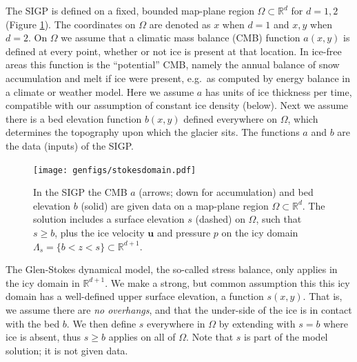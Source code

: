 \documentclass[letterpaper,final,12pt,reqno]{amsart}
\theoremstyle{claim}
\newcommand{\RR}{\mathbb{R}}
\newcommand{\bu}{\mathbf{u}}
\numberwithin{equation}{section}
\numberwithin{figure}{section}
\numberwithin{table}{section}
\numberwithin{theorem}{section}
\begin{document}
The SIGP is defined on a fixed, bounded map-plane region $\Omega \subset \RR^d$ for $d=1,2$ (Figure \ref{fig:stokesdomain}).  The coordinates on $\Omega$ are denoted as $x$ when $d=1$ and $x,y$ when $d=2$.  On $\Omega$ we assume that a climatic mass balance (CMB) \cite{Cogleyetal2011} function $a(x,y)$ is defined at every point, whether or not ice is present at that location.  In ice-free areas this function is the ``potential'' CMB, namely the annual balance of snow accumulation and melt if ice were present, e.g.~as computed by energy balance in a climate or weather model.  Here we assume $a$ has units of ice thickness per time, compatible with our assumption of constant ice density (below).  Next we assume there is a bed elevation function $b(x,y)$ defined everywhere on $\Omega$, which determines the topography upon which the glacier sits.  The functions $a$ and $b$ are the data (inputs) of the SIGP.

\begin{figure}[t]
\begin{center}
\texttt{[image: genfigs/stokesdomain.pdf]}
\end{center}
\caption{In the SIGP the CMB $a$ (arrows; down for accumulation) and bed elevation $b$ (solid) are given data on a map-plane region $\Omega \subset \RR^d$.  The solution includes a surface elevation $s$ (dashed) on $\Omega$, such that $s\ge b$, plus the ice velocity $\bu$ and pressure $p$ on the icy domain $\Lambda_s = \{b < z < s\} \subset \RR^{d+1}$.}
\label{fig:stokesdomain}
\end{figure}

The Glen-Stokes dynamical model, the so-called stress balance, only applies in the icy domain in $\RR^{d+1}$.  We make a strong, but common \cite[for example]{IsaacStadlerGhattas2015,Jouvetetal2008,Lengetal2012,WirbelJarosch2020} assumption this this icy domain has a well-defined upper surface elevation, a function $s(x,y)$.  That is, we assume there are \emph{no overhangs}, and that the under-side of the ice is in contact with the bed $b$.  We then define $s$ everywhere in $\Omega$ by extending with $s=b$ where ice is absent, thus $s\ge b$ applies on all of $\Omega$.  Note that $s$ is part of the model solution; it is not given data.
\end{document}
